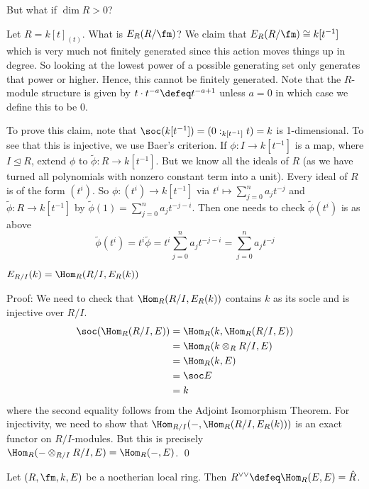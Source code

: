 But what if $\dim R>0$? 

\begin{ex}
Let $R=k[t]_{(t)}$. What is $E_R(R/\fm)$? We claim that $E_R(R/\fm) \cong k[t^{-1}]$ which is very much not finitely generated since this action moves things up in degree. So looking at the lowest power of a possible generating set only generates that power or higher. Hence, this cannot be finitely generated. Note that the $R$-module structure is given by $t \cdot t^{-a} \defeq t^{-a+1}$ unless $a=0$ in which case we define this to be 0. 

To prove this claim, note that $\soc(k[t^{-1}])=(0:_{k[t^{-1}]} t)=k$ is 1-dimensional. To see that this is injective, we use Baer's criterion. If $\phi: I \to k[t^{-1}]$ is a map, where $I \unlhd R$, extend $\phi$ to $\tilde{\phi}: R \to k[t^{-1}]$. But we know all the ideals of $R$ (as we have turned all polynomials with nonzero constant term into a unit). Every ideal of $R$ is of the form $(t^i)$. So $\phi: (t^i) \to k[t^{-1}]$ via $t^i \mapsto \sum_{j=0}^n a_j t^{-j}$ and $\tilde{\phi}: R \to k[t^{-1}]$ by $\tilde{\phi}(1)=\sum_{j=0}^n a_j t^{-j-i}$. Then one needs to check $\tilde{\phi}(t^i)$ is as above
\[
\tilde{\phi}(t^i)=t^i\tilde{\phi}= t^i \sum_{j=0}^n a_j t^{-j-i}= \sum_{j=0}^n a_j t^{-j} 
\]
\end{ex}

\begin{lem}
$E_{R/I}(k)=\Hom_R(R/I,E_R(k))$
\end{lem}

\noindent Proof: We need to check that $\Hom_R(R/I,E_R(k))$ contains $k$ as its socle and is injective over $R/I$. 
\[
\begin{split}
\soc(\Hom_R(R/I,E))&=\Hom_R(k,\Hom_R(R/I,E)) \\
&=\Hom_R(k \otimes_R R/I,E) \\
&=\Hom_R(k,E) \\
&=\soc E \\
&=k
\end{split}
\]
where the second equality follows from the Adjoint Isomorphism Theorem. For injectivity, we need to show that $\Hom_{R/I}(-,\Hom_R(R/I,E_R(k)))$ is an exact functor on $R/I$-modules. But this is precisely $\Hom_R(-\otimes_{R/I} R/I,E)=\Hom_R(-,E)$. \qed \\

\begin{thmm}
Let $(R,\fm,k,E)$ be a noetherian local ring. Then $R^{\vee \vee}\defeq \Hom_R(E,E)=\hat{R}$.
\end{thmm}

